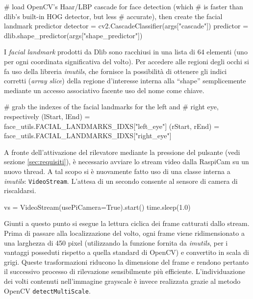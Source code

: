 \documentclass[12pt]{article}
\newcommand{\quotes}[1]{``#1''}
\begin{document}
\begin{python}
	# load OpenCV's Haar/LBP cascade for face detection (which
	# is faster than dlib's built-in HOG detector, but less
	# accurate), then create the facial landmark predictor
	detector = cv2.CascadeClassifier(args["cascade"])
	predictor = dlib.shape_predictor(args["shape_predictor"])
\end{python}

\vspace{0.3cm}
I \textit{facial landmark} prodotti da Dlib sono racchiusi in una lista di 64 elementi (uno per ogni coordinata significativa del volto). Per accedere alle regioni degli occhi si fa uso della libreria \textit{imutils}, che fornisce la possibilità di ottenere gli indici corretti (\textit{array slice}) della regione d'interesse interna alla \quotes{shape} semplicemente mediante un accesso associativo facente uso del nome come chiave.
\vspace{0.3cm}

\begin{python}
	# grab the indexes of the facial landmarks for the left and
	# right eye, respectively
	(lStart, lEnd) = face_utils.FACIAL_LANDMARKS_IDXS["left_eye"]
	(rStart, rEnd) = face_utils.FACIAL_LANDMARKS_IDXS["right_eye"]
\end{python}

\vspace{0.3cm}
A fronte dell'attivazione del rilevatore mediante la pressione del pulsante (vedi sezione \ref{sec:requisiti}), è necessario avviare lo stream video dalla RaspiCam su un nuovo thread. A tal scopo si è nuovamente fatto uso di una classe interna a \textit{imutils}: \texttt{VideoStream}. L'attesa di un secondo consente al sensore di camera di riscaldarsi.
\vspace{0.3cm}

\begin{python}
	vs = VideoStream(usePiCamera=True).start()
	time.sleep(1.0)
\end{python}

\vspace{0.3cm}
Giunti a questo punto si esegue la lettura ciclica dei frame catturati dallo stream. Prima di passare alla localizzazione del volto, ogni frame viene ridimensionato a una larghezza di 450 pixel (utilizzando la funzione fornita da \textit{imutils}, per i vantaggi posseduti rispetto a quella standard di OpenCV) e convertito in scala di grigi. Queste trasformazioni riducono la dimensione del frame e rendono pertanto il successivo processo di rilevazione sensibilmente più efficiente. L'individuazione dei volti contenuti nell'immagine grayscale è invece  realizzata grazie al metodo OpenCV \texttt{detectMultiScale}\cite{OpenCVCascadeClassifier}.
\vspace{0.3cm}
\end{document}
